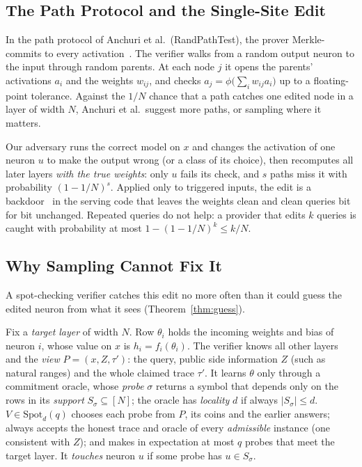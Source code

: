\subsection{The Path Protocol and the Single-Site Edit}
\label{sec:path}

In the path protocol of Anchuri et al.\ (RandPathTest), the prover Merkle-commits to every
activation~\cite{merkle1987}. The verifier walks from a random output neuron to the input through
random parents. At each node $j$ it opens the parents' activations $a_i$ and the weights $w_{ij}$,
and checks $a_j=\phi\big(\sum_i w_{ij}a_i\big)$ up to a floating-point tolerance. Against the
$1/N$ chance that a path catches one edited node in a layer of width $N$, Anchuri et al.\ suggest
more paths, or sampling where it matters.

 Our adversary runs the correct model on $x$ and changes the
activation of one neuron $u$ to make the output wrong (or a class of its choice), then recomputes
all later layers \emph{with the true weights}: only $u$ fails its check, and $s$ paths miss it
with probability $(1-1/N)^s$. Applied only to triggered inputs, the edit is a
backdoor~\cite{gu2019badnets} in the serving code that leaves the weights clean and clean queries
bit for bit unchanged. Repeated queries do not help: a provider that edits $k$ queries is
caught with probability at most $1-(1-1/N)^k\le k/N$.

\subsection{Why Sampling Cannot Fix It}
\label{sec:sampling}

A spot-checking verifier catches this edit no more often than it could guess the edited neuron
from what it sees (Theorem~\ref{thm:guess}).

\begin{definition}
\label{def:spot}
Fix a \emph{target layer} of width $N$. Row $\theta_i$ holds the incoming weights and bias of
neuron $i$, whose value on $x$ is $h_i=f_i(\theta_i)$. The verifier knows all other layers and the
\emph{view} $P=(x,Z,\tau')$: the query, public side information $Z$ (such as natural ranges) and
the whole claimed trace $\tau'$. It learns $\theta$ only through a commitment oracle, whose \emph{probe}
$\sigma$ returns a symbol that depends only on the rows in its \emph{support}
$S_\sigma\subseteq[N]$; the oracle has \emph{locality} $d$ if always $|S_\sigma|\le d$.
$V\in\mathrm{Spot}_d(q)$ chooses
each probe from $P$, its coins and the earlier answers; always accepts the honest trace and oracle
of every \emph{admissible} instance (one consistent with $Z$); and makes in expectation at most $q$
probes that meet the target layer. It \emph{touches} neuron $u$ if some probe has $u\in S_\sigma$.
\end{definition}

